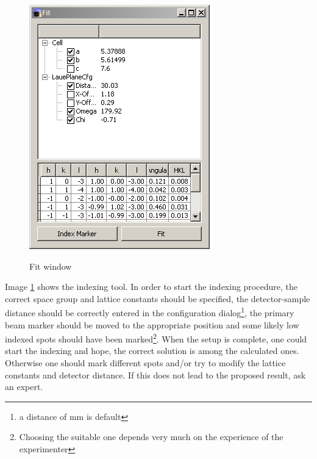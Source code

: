 \begin{figure}[htb]
\begin{minipage}[b]{0.35\textwidth}
    \includegraphics[width=\textwidth]{clip/Tool_Fit}
    \label{Clip:FigToolFit}
    \caption{Fit window}
  \end{minipage}
\end{figure}




Image \ref{Clip:FigToolFit} shows the indexing tool. In order to start
the indexing procedure, the correct space group and lattice constants
should be specified, the detector-sample distance should be correctly
entered in the configuration dialog\footnote{a distance of
  \unit[30]{mm} is default}, the primary beam marker should be moved
to the appropriate position and some likely low indexed spots should
have been marked\footnote{Choosing the suitable one depends very much
  on the experience of the experimenter}.  When the setup is complete,
one could start the indexing and hope, the correct solution is among
the calculated ones. Otherwise one should mark different spots and/or
try to modify the lattice constants and detector distance. If this
does not lead to the proposed result, ask an expert.



